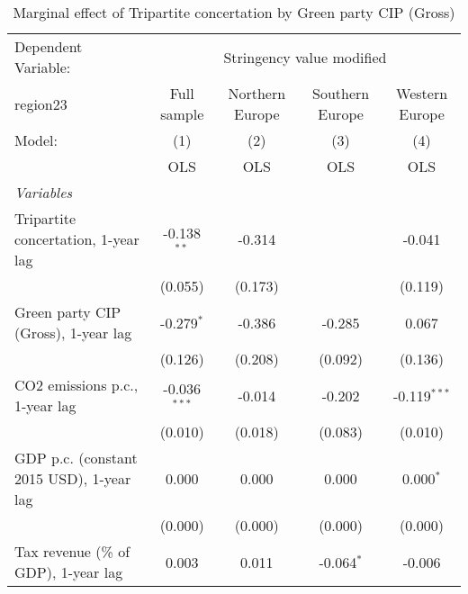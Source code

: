 
\begin{table}[htbp]
   \caption{Marginal effect of Tripartite concertation by Green party CIP (Gross)}
   \centering
   \begin{tabular}{lcccc}
      \toprule
      Dependent Variable: & \multicolumn{4}{c}{Stringency value modified}\\
      region23                                                                  & Full sample    & Northern Europe & Southern Europe & Western Europe \\   
      Model:                                                                    & (1)            & (2)             & (3)             & (4)\\  
                                                                                &  OLS           & OLS             & OLS             & OLS\\  
      \midrule
      \emph{Variables}\\
      Tripartite concertation, 1-year lag                                       & -0.138$^{**}$  & -0.314          &                 & -0.041\\   
                                                                                & (0.055)        & (0.173)         &                 & (0.119)\\   
      Green party CIP (Gross), 1-year lag                                       & -0.279$^{*}$   & -0.386          & -0.285          & 0.067\\   
                                                                                & (0.126)        & (0.208)         & (0.092)         & (0.136)\\   
      CO2 emissions p.c., 1-year lag                                            & -0.036$^{***}$ & -0.014          & -0.202          & -0.119$^{***}$\\   
                                                                                & (0.010)        & (0.018)         & (0.083)         & (0.010)\\   
      GDP p.c. (constant 2015 USD), 1-year lag                                  & 0.000          & 0.000           & 0.000           & 0.000$^{*}$\\   
                                                                                & (0.000)        & (0.000)         & (0.000)         & (0.000)\\   
      Tax revenue (\% of GDP), 1-year lag                                       & 0.003          & 0.011           & -0.064$^{*}$    & -0.006\\   

\end{tabular}
\end{table}
